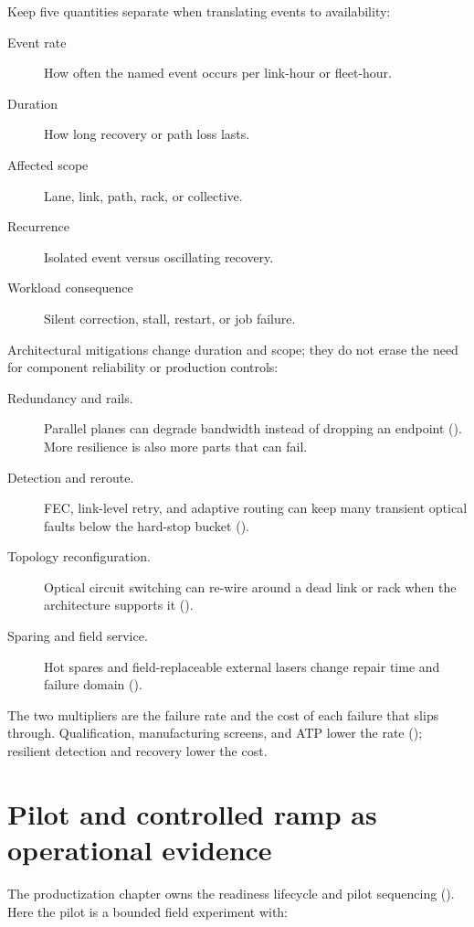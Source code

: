 Keep five quantities separate when translating events to availability:

\begin{description}
\item[Event rate] How often the named event occurs per link-hour or fleet-hour.
\item[Duration] How long recovery or path loss lasts.
\item[Affected scope] Lane, link, path, rack, or collective.
\item[Recurrence] Isolated event versus oscillating recovery.
\item[Workload consequence] Silent correction, stall, restart, or job failure.
\end{description}

Architectural mitigations change duration and scope; they do not erase the need
for component reliability or production controls:

\begin{description}
\item[Redundancy and rails.] Parallel planes can degrade bandwidth instead of
      dropping an endpoint (). More resilience is also more
      parts that can fail.
\item[Detection and reroute.] FEC, link-level retry, and adaptive routing can
      keep many transient optical faults below the hard-stop bucket
      ().
\item[Topology reconfiguration.] Optical circuit switching can re-wire around a
      dead link or rack when the architecture supports it ().
\item[Sparing and field service.] Hot spares and field-replaceable external
      lasers change repair time and failure domain ().
\end{description}

The two multipliers are the failure rate and the cost of each failure that
slips through. Qualification, manufacturing screens, and ATP lower the rate
(); resilient detection and recovery
lower the cost.

\section{Pilot and controlled ramp as operational evidence}
\label{sec:ops-pilot-evidence}

The productization chapter owns the readiness lifecycle and pilot sequencing
(). Here the pilot is a bounded
field experiment with:

